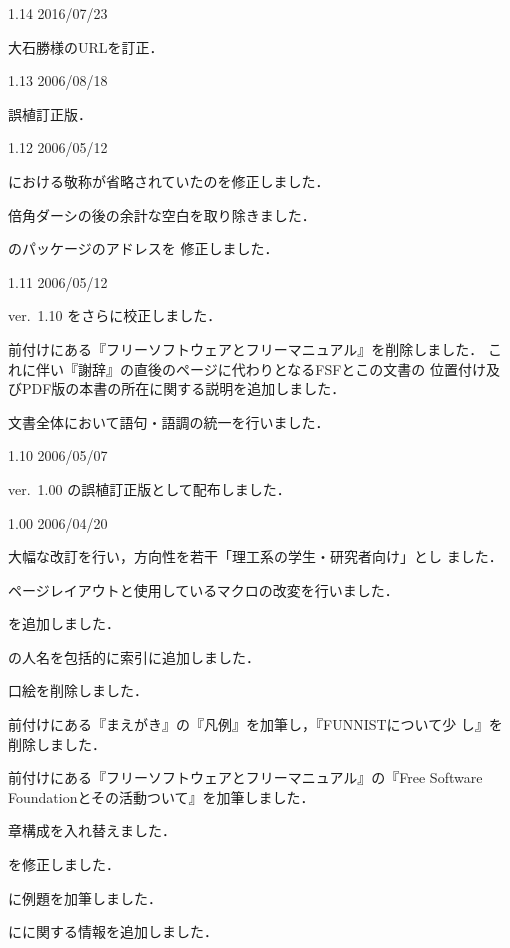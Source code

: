\begin{changelog}
 \item[1.14 2016/07/23] %
   \item 大石勝様のURLを訂正．

 \item[1.13 2006/08/18] %
   \item 誤植訂正版．

 \item[1.12 2006/05/12] %
   \item {}における敬称が省略されていたのを修正しました．
   \item 倍角ダーシの後の余計な空白を取り除きました．
   \item {}のパッケージのアドレスを
   修正しました．
 \item[1.11 2006/05/12] %
   \item ver.~1.10 をさらに校正しました．
   \item 前付けにある『フリーソフトウェアとフリーマニュアル』を削除しました．
   これに伴い『謝辞』の直後のページに代わりとなるFSFとこの文書の
   位置付け及びPDF版の本書の所在に関する説明を追加しました．
   \item 文書全体において語句・語調の統一を行いました．
 \item[1.10 2006/05/07] %
   \item ver.~1.00 の誤植訂正版として配布しました．
 \item[1.00 2006/04/20] %
   \item 大幅な改訂を行い，方向性を若干「理工系の学生・研究者向け」とし
   ました．
   \item ページレイアウトと使用しているマクロの改変を行いました．
   \item {}を追加しました．
   \item {}の人名を包括的に索引に追加しました．
   \item 口絵を削除しました．
   \item 前付けにある『まえがき』の『凡例』を加筆し，『FUNNISTについて少
   し』を削除しました．
   \item 前付けにある『フリーソフトウェアとフリーマニュアル』の『Free
   Software Foundationとその活動ついて』を加筆しました．
   \item 章構成を入れ替えました．
   \item {}を修正しました．
   \item {}に例題を加筆しました．
   \item {}に\AmSLaTeX に関する情報を追加しました．

\end{changelog}
